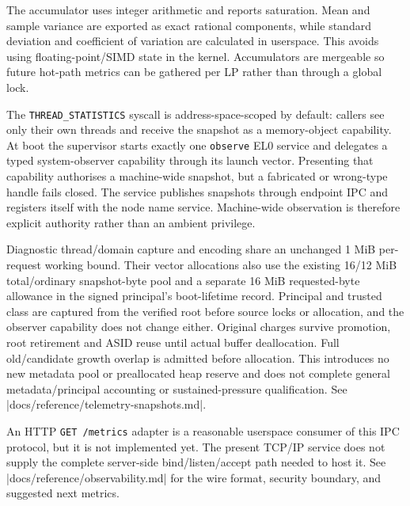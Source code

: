 The accumulator uses integer arithmetic and reports saturation. Mean and sample
variance are exported as exact rational components, while standard deviation and
coefficient of variation are calculated in userspace. This avoids using
floating-point/SIMD state in the kernel. Accumulators are mergeable so future
hot-path metrics can be gathered per LP rather than through a global lock.

The \texttt{THREAD\_STATISTICS} syscall is address-space-scoped by default:
callers see only their own threads and receive the snapshot as a memory-object
capability. At boot the supervisor starts exactly one \texttt{observe} EL0
service and delegates a typed system-observer capability through its launch
vector. Presenting that capability authorises a machine-wide snapshot, but a
fabricated or wrong-type handle fails closed. The service publishes snapshots
through endpoint IPC and registers itself with the node name service.
Machine-wide observation is therefore explicit authority rather than an
ambient privilege.

Diagnostic thread/domain capture and encoding share an unchanged 1 MiB
per-request working bound. Their vector allocations also use the existing
16/12 MiB total/ordinary snapshot-byte pool and a separate 16 MiB requested-byte
allowance in the signed principal's boot-lifetime record. Principal and trusted
class are captured from the verified root before source locks or allocation, and
the observer capability does not change either. Original charges survive
promotion, root retirement and ASID reuse until actual buffer deallocation.
Full old/candidate growth overlap is admitted before allocation. This introduces
no new metadata pool or preallocated heap reserve and does not complete general
metadata/principal accounting or sustained-pressure qualification. See
\repofile|docs/reference/telemetry-snapshots.md|.

An HTTP \texttt{GET /metrics} adapter is a reasonable userspace consumer of
this IPC protocol, but it is not implemented yet. The present TCP/IP service
does not supply the complete server-side bind/listen/accept path needed to host
it. See \repofile|docs/reference/observability.md| for the wire format, security boundary,
and suggested next metrics.

\endinput
